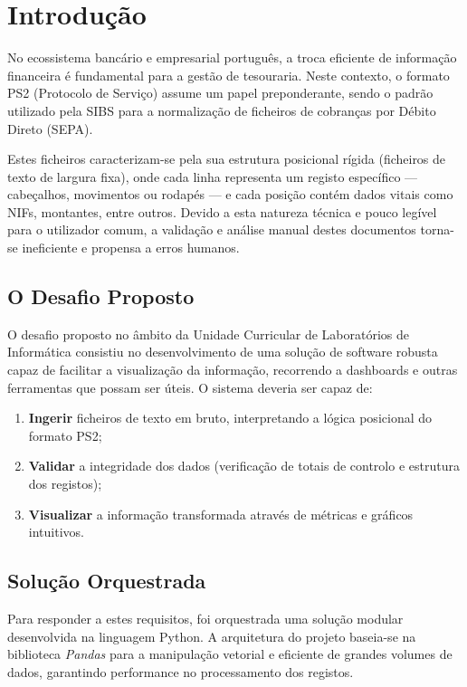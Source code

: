 \documentclass[12pt, a4paper]{article}
\begin{document}

\section{Introdução}

No ecossistema bancário e empresarial português, a troca eficiente de informação financeira é fundamental para a gestão de tesouraria. Neste contexto, o formato PS2 (Protocolo de Serviço) assume um papel preponderante, sendo o padrão utilizado pela SIBS para a normalização de ficheiros de cobranças por Débito Direto (SEPA).

Estes ficheiros caracterizam-se pela sua estrutura posicional rígida (ficheiros de texto de largura fixa), onde cada linha representa um registo específico — cabeçalhos, movimentos ou rodapés — e cada posição contém dados vitais como NIFs, montantes, entre outros. Devido a esta natureza técnica e pouco legível para o utilizador comum, a validação e análise manual destes documentos torna-se ineficiente e propensa a erros humanos.

\subsection{O Desafio Proposto}
O desafio proposto no âmbito da Unidade Curricular de Laboratórios de Informática consistiu no desenvolvimento de uma solução de software robusta capaz de facilitar a visualização da informação, recorrendo a dashboards e outras ferramentas que possam ser úteis. O sistema deveria ser capaz de:
\begin{enumerate}
    \item \textbf{Ingerir} ficheiros de texto em bruto, interpretando a lógica posicional do formato PS2;
    \item \textbf{Validar} a integridade dos dados (verificação de totais de controlo e estrutura dos registos);
    \item \textbf{Visualizar} a informação transformada através de métricas e gráficos intuitivos.
\end{enumerate}

\subsection{Solução Orquestrada}
Para responder a estes requisitos, foi orquestrada uma solução modular desenvolvida na linguagem Python. A arquitetura do projeto baseia-se na biblioteca \textit{Pandas} \cite{mckinney2012} para a manipulação vetorial e eficiente de grandes volumes de dados, garantindo performance no processamento dos registos.
\end{document}
